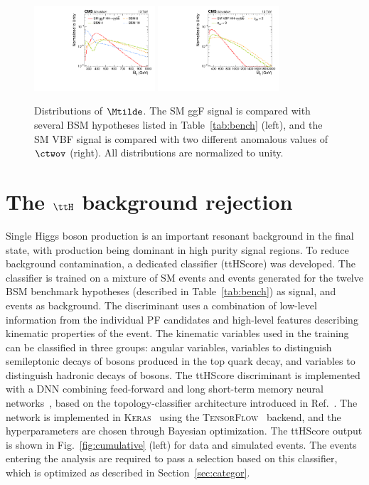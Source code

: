 \documentclass[11pt,a4paper,cmspaper,final,collab]{cms-tdr}
\begin{document}
\begin{figure}[hbt!]
\centering
\includegraphics[width=0.4\textwidth]{Figure_004-a.pdf}
\includegraphics[width=0.4\textwidth]{Figure_004-b.pdf}
\caption{Distributions of $\Mtilde$. The SM ggF \HH
signal is compared with several BSM hypotheses listed in Table~\ref{tab:bench} (left),
and the SM VBF \HH signal is compared with two different anomalous values of $\ctwov$ (right). All distributions are normalized to unity.}
\label{fig:mx}\end{figure}


\section{The \texorpdfstring{$\ttH$}{ttH} background rejection}
\label{sec:ttHDiscSec}
Single Higgs boson production is an important resonant background in the \bbgg final state, with \ttH production being dominant in high purity signal regions. To reduce \ttH background contamination, a dedicated classifier (\mbox{ttHScore}) was developed. The classifier is trained on a mixture of SM \HH events and events generated for the twelve BSM benchmark hypotheses (described in Table~\ref{tab:bench}) as signal, and \ttH events as background. The discriminant uses a combination of low-level information from the individual PF candidates and high-level features describing kinematic properties of the event. The kinematic variables used in the training can be classified in three groups: angular variables, variables to distinguish semileptonic decays of \PW bosons produced in the top quark decay, and variables to distinguish hadronic decays of \PW bosons. The \mbox{ttHScore} discriminant is implemented with a DNN 
combining feed-forward and long short-term memory neural networks~\cite{Schmidhuber}, based on the topology-classifier architecture introduced in Ref.~\cite{Nguyen:2018ugw}. The network is implemented in \textsc{Keras}~\cite{chollet2015keras} using the \textsc{TensorFlow}~\cite{tensorflow2015-whitepaper} backend, and the hyperparameters are chosen through Bayesian optimization. 
The \mbox{ttHScore} output is shown in Fig.~\ref{fig:cumulative} (left) for data and simulated events. 
The events entering the analysis are required to pass a selection based on this classifier, which is optimized as described in Section~\ref{sec:categor}.
\end{document}
